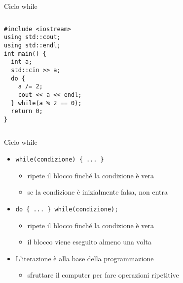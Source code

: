 \begin{frame}[fragile]{Ciclo while}
  \vfill
  \begin{columns}[c]
    \vfill
    \begin{lstlisting}
#include <iostream>
using std::cout;
using std::endl;
int main() {
  int a;
  std::cin >> a;
  do {
    a /= 2;
    cout << a << endl;
  } while(a % 2 == 0);
  return 0;
}
    \end{lstlisting}
    \vfill
    \vfill
    \begin{center}\end{center}
    \vfill
  \end{columns}
  \vfill
\end{frame}

\begin{frame}[fragile]{Ciclo while}
  \vfill
  \begin{itemize}
    \item \lstinline$while(condizione) { ... }$
    \begin{itemize}
      \item ripete il blocco finché la condizione è vera
      \item se la condizione è inizialmente falsa, non entra
    \end{itemize}
    \vfill
    \item \lstinline$do { ... } while(condizione);$
    \begin{itemize}
      \item ripete il blocco finché la condizione è vera
      \item il blocco viene eseguito \alert{almeno} una volta
    \end{itemize}
    \vfill
    \item L'\alert{iterazione} è alla base della programmazione
    \begin{itemize}
      \item sfruttare il computer per fare operazioni ripetitive
    \end{itemize}
  \end{itemize}
  \vfill
\end{frame}

